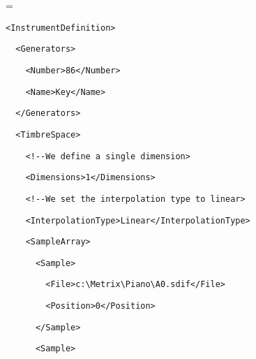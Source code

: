 \documentclass[a4paper,english,american]{book}
\makeatletter
\let\realnormalsize=\normalsize
\def\liih@math{\ifmmode$\else\bad@math\fi}
\def\adjustnormalsize{\def\normalsize{\mathsurround=0pt \realnormalsize
 \parindent=0pt\abovedisplayskip=0pt\belowdisplayskip=0pt}%
 \def\phantompar{\csname par\endcsname}\normalsize}%
\newcommand\lthtmlvboxmathA{\adjustnormalsize\setbox\sizebox=\vbox\bgroup %
 \let\ifinner=\iffalse \let\)\liih@math }%
\newcommand\lthtmlmathtype[1]{\gdef\lthtmlmathenv{#1}}%
\newcommand\lthtmlfigureA[1]{\let\@savefreelist\@freelist
       \lthtmlmathtype{#1}\lthtmlvboxmathA}%
\makeatother
\begin{document}
{\newpage\clearpage
\lthtmlfigureA{spacing3993}%
\begin{spacing}{0.8}
\texttt{\footnotesize <InstrumentDefinition>}{\footnotesize\par
}
\par
\texttt{\footnotesize ~~<Generators>}{\footnotesize\par
}
\par
\texttt{\footnotesize ~~~~<Number>86</Number>}{\footnotesize\par
}
\par
\texttt{\footnotesize ~~~~<Name>Key</Name>}{\footnotesize\par
}
\par
\texttt{\footnotesize ~~</Generators>}{\footnotesize\par
}
\par
\texttt{\footnotesize ~~<TimbreSpace>}{\footnotesize\par
}
\par
\texttt{\footnotesize ~~~~<!-{}-We define a single dimension>}{\footnotesize\par
}
\par
\texttt{\footnotesize ~~~~<Dimensions>1</Dimensions>}{\footnotesize\par
}
\par
\texttt{\footnotesize ~~~~<!-{}-We set the interpolation type
to linear>}{\footnotesize\par
}
\par
\texttt{\footnotesize ~~~~<InterpolationType>Linear</InterpolationType>}{\footnotesize\par
}
\par
\texttt{\footnotesize ~~~~<SampleArray>}{\footnotesize\par
}
\par
\texttt{\footnotesize ~~~~~~<Sample>}{\footnotesize\par
}
\par
\texttt{\footnotesize ~~~~~~~~<File>c:\textbackslash{}Metrix\textbackslash{}Piano\textbackslash{}A0.sdif</File>}{\footnotesize\par
}
\par
\texttt{\footnotesize ~~~~~~~~<Position>0</Position>}{\footnotesize\par
}
\par
\texttt{\footnotesize ~~~~~~</Sample>}{\footnotesize\par
}
\par
\texttt{\footnotesize ~~~~~~<Sample>}{\footnotesize\par
}
\par

\end{spacing}}
\end{document}
